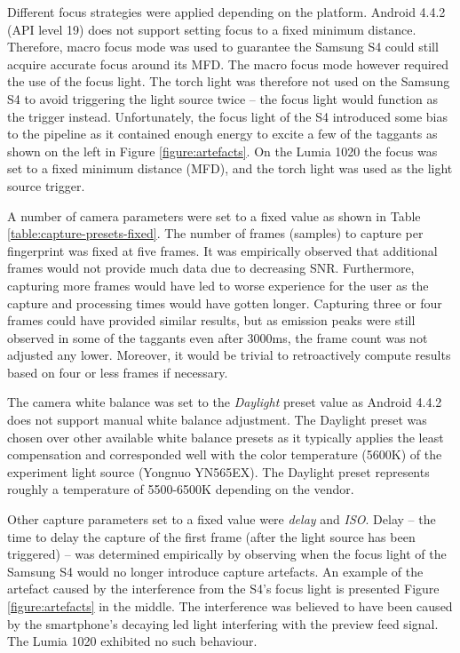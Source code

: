 \documentclass[thesis.tex]{subfiles}
\begin{document}
Different focus strategies were applied depending on the platform. Android 4.4.2 (API level 19) does not support setting focus to a fixed minimum distance. Therefore, macro focus mode was used to guarantee the Samsung S4 could still acquire accurate focus around its MFD. The macro focus mode however required the use of the focus light. The torch light was therefore not used on the Samsung S4 to avoid triggering the light source twice -- the focus light would function as the trigger instead. Unfortunately, the focus light of the S4 introduced some bias to the pipeline as it contained enough energy to excite a few of the taggants as shown on the left in Figure \ref{figure:artefacts}. On the Lumia 1020 the focus was set to a fixed minimum distance (MFD), and the torch light was used as the light source trigger.

A number of camera parameters were set to a fixed value as shown in Table \ref{table:capture-presets-fixed}. The number of frames (samples) to capture per fingerprint was fixed at five frames. It was empirically observed that additional frames would not provide much data due to decreasing SNR. Furthermore, capturing more frames would have led to worse experience for the user as the capture and processing times would have gotten longer. Capturing three or four frames could have provided similar results, but as emission peaks were still observed in some of the taggants even after 3000ms, the frame count was not adjusted any lower. Moreover, it would be trivial to retroactively compute results based on four or less frames if necessary.

The camera white balance was set to the \emph{Daylight} preset value as Android 4.4.2 does not support manual white balance adjustment. The Daylight preset was chosen over other available white balance presets as it typically applies the least compensation and corresponded well with the color temperature (5600K) of the experiment light source (Yongnuo YN565EX). The Daylight preset represents roughly a temperature of 5500-6500K depending on the vendor.

Other capture parameters set to a fixed value were \emph{delay} and \emph{ISO}. Delay -- the time to delay the capture of the first frame (after the light source has been triggered) -- was determined empirically by observing when the focus light of the Samsung S4 would no longer introduce capture artefacts. An example of the artefact caused by the interference from the S4's focus light is presented Figure \ref{figure:artefacts} in the middle. The interference was believed to have been caused by the smartphone's decaying led light interfering with the preview feed signal. The Lumia 1020 exhibited no such behaviour.
\end{document}
